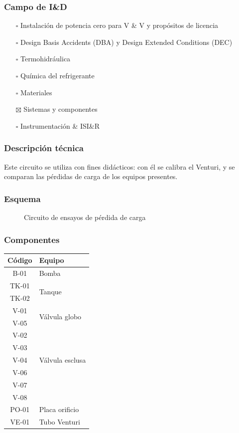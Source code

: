 \documentclass{article}
\begin{document}
\subsubsection*{Campo de I\&D}
\begin{itemize}
\item[$\square$] Instalación de potencia cero para V \& V y propósitos de licencia
\item[$\square$] Design Basis Accidents (DBA) y Design Extended Conditions (DEC)
\item[$\square$] Termohidráulica
\item[$\square$] Química del refrigerante
\item[$\square$] Materiales
\item[$\boxtimes$] Sistemas y componentes
\item[$\square$] Instrumentación \& ISI\&R
\end{itemize}
\subsubsection*{Descripción técnica}
Este circuito se utiliza con fines didácticos: con él se calibra el Venturi, y se comparan las pérdidas de carga de los equipos presentes.
\subsubsection*{Esquema}
\begin{figure}[H]
\begin{center}
\end{center}
\caption{Circuito de ensayos de pérdida de carga}
\end{figure}
\subsubsection*{Componentes}
\begin{table}[H]
\centering
\begin{tabular}{cp{3.5cm}}
\toprule
Código & Equipo \\
\midrule
B-01 & Bomba \\
\midrule
TK-01 & \multirow{2}{*}{Tanque} \\
TK-02 & \\
\midrule
V-01 & \multirow{2}{*}{Válvula globo} \\
V-05 & \\
\midrule
V-02 & \multirow{5}{*}{Válvula esclusa} \\
V-03 & \\
V-04 & \\
V-06 & \\
V-07 & \\
V-08 & \\
\midrule
PO-01 & Placa orificio \\
\midrule
VE-01 & Tubo Venturi \\
\bottomrule
\end{tabular}
\end{table}
\end{document}

